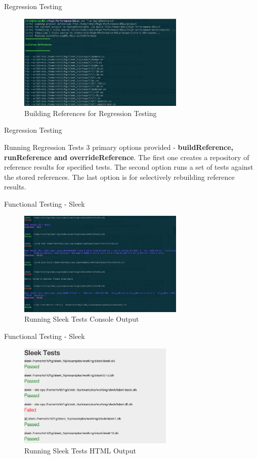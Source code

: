 \begin{frame}{Regression Testing}
\begin{figure}[H]
  \centering
    \includegraphics[width=300px]{figures/building_reference.png}
  \caption{Building References for Regression Testing}
\end{figure}
\end{frame}

\begin{frame}{Regression Testing}
\begin{block}{Running Regression Tests}
3 primary options provided - \textbf{buildReference, runReference and overrideReference}. The first one creates a repository of reference results for specified tests. The second option runs a set of tests against the stored references. The last option is for selectively rebuilding reference results.
\end{block}
\end{frame}

\begin{frame}{Functional Testing - Sleek}
\begin{figure}[H]
  \centering
    \includegraphics[width=300px]{figures/sleek_testing.png}
  \caption{Running Sleek Tests Console Output}
\end{figure}
\end{frame}

\begin{frame}{Functional Testing - Sleek}
\begin{figure}[H]
  \centering
    \includegraphics[width=280px]{figures/web_output_1.png}
  \caption{Running Sleek Tests HTML Output}
\end{figure}
\end{frame}

